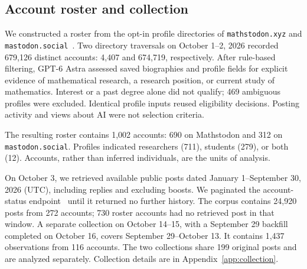 \documentclass[sigconf,balance=false]{acmart}
\begin{document}
\subsection{Account roster and collection}
We constructed a roster from the opt-in profile directories of \nolinkurl{mathstodon.xyz} and \nolinkurl{mastodon.social}~\cite{mastodondirectory,mastodondirectoryapi}. Two directory traversals on October 1--2, 2026 recorded 679,126 distinct accounts: 4,407 and 674,719, respectively. After rule-based filtering, GPT-6 Astra assessed saved biographies and profile fields for explicit evidence of mathematical research, a research position, or current study of mathematics. Interest or a past degree alone did not qualify; 469 ambiguous profiles were excluded. Identical profile inputs reused eligibility decisions. Posting activity and views about AI were not selection criteria.

The resulting roster contains 1,002 accounts: 690 on Mathstodon and 312 on \nolinkurl{mastodon.social}. Profiles indicated researchers (711), students (279), or both (12). Accounts, rather than inferred individuals, are the units of analysis.

On October 3, we retrieved available public posts dated January 1--September 30, 2026 (UTC), including replies and excluding boosts. We paginated the account-status endpoint~\cite{mastodonaccounts,mastodonpagination} until it returned no further history. The corpus contains 24,920 posts from 272 accounts; 730 roster accounts had no retrieved post in that window. A separate collection on October 14--15, with a September 29 backfill completed on October 16, covers September 29--October 13. It contains 1,437 observations from 116 accounts. The two collections share 199 original posts and are analyzed separately. Collection details are in Appendix~\ref{app:collection}.
\end{document}
